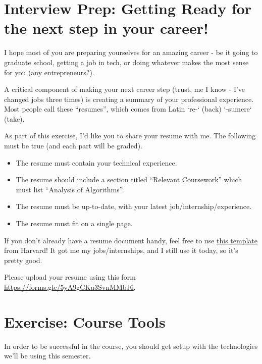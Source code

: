 \documentclass [12pt]{article}
\begin{document}

\pagebreak
\section{Interview Prep: Getting Ready for the next step in your career!}
 I hope most of you are preparing yourselves for an amazing career - be it going to graduate school, getting a job in tech, or doing whatever makes the most sense for you (any entrepreneurs?).

A critical component of making your next career step (trust, me I know - I've changed jobs three times) is creating a summary of your professional experience. Most people call these ``resumes'', which comes from Latin `re-` (back) `-sumere` (take).

As part of this exercise, I'd like you to share your resume with me. The following must be true (and each part will be graded).

\begin{itemize}
    \item {} The resume must contain your technical experience.
    \item {} The resume should include a section titled ``Relevant Coursework'' which must list ``Analysis of Algorithms''. 
    \item {} The resume must be up-to-date, with your latest job/internship/experience.
    \item {} The resume must fit on a single page. 
\end{itemize}

If you don't already have a resume document handy, feel free to use \href{http://hwpi.harvard.edu/files/ocs/files/template_bullet.doc}{this template} from Harvard! It got me my jobs/internships, and I still use it today, so it's pretty good.

Please upload your resume using this form \href{https://forms.gle/5yA9gCKu3SvnMMbJ6}{https://forms.gle/5yA9gCKu3SvnMMbJ6}.


\section{Exercise: Course Tools}
 In order to be successful in the course, you should get setup with the technologies we'll be using this semester. 
\end{document}

